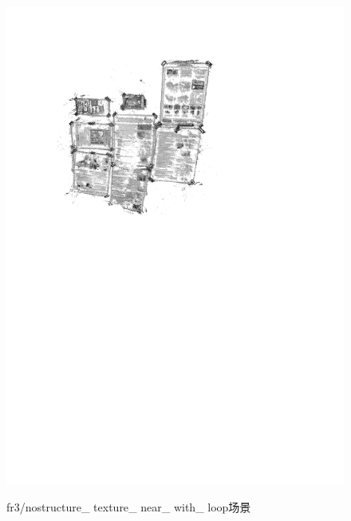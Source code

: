 \begin{figure}[H]
{          \includegraphics[scale=0.6]{figures/Fig4-5_b.pdf}
          }
     \caption{fr3/nostructure\_ texture\_ near\_ with\_ loop场景}
\label{fig4.5}
\end{figure}



